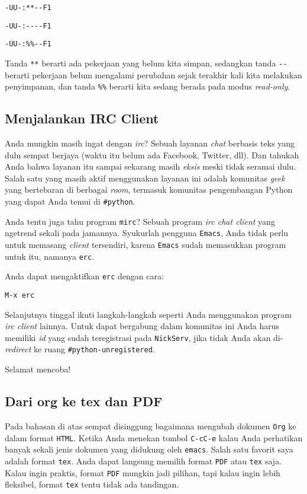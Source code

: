 \documentclass{article}
\begin{document}
\verb=-UU-:**--F1=

\verb=-UU-:----F1=

\verb=-UU-:%%--F1=

Tanda \verb=**= berarti ada pekerjaan yang belum kita simpan, sedangkan tanda
\verb=--= berarti pekerjaan belum mengalami perubahan sejak terakhir kali
kita melakukan penyimpanan, dan tanda \verb=%%= berarti kita sedang berada
pada modus \emph{read-only}.

\subsection{Menjalankan IRC Client}
Anda mungkin masih ingat dengan \emph{irc}? Sebuah layanan \emph{chat}
berbasis teks yang dulu sempat berjaya (waktu itu belum ada Facebook,
Twitter, dll). Dan tahukah Anda bahwa layanan itu sampai sekarang masih
\emph{eksis} meski tidak seramai dulu. Salah satu yang masih aktif
menggunakan layanan ini adalah komunitas \emph{geek} yang bertebaran
di berbagai \emph{room}, termasuk komunitas pengembangan Python yang
dapat Anda temui di \verb=#python=. 

Anda tentu juga tahu program \verb=mirc=? Sebuah program \emph{irc chat client}
yang ngetrend sekali pada jamannya. Syukurlah pengguna \verb=Emacs=, Anda 
tidak perlu untuk memasang \emph{client} tersendiri, karena \verb=Emacs= 
sudah memasukkan program untuk itu, namanya \verb=erc=.

Anda dapat mengaktifkan \verb=erc= dengan cara:

\begin{verbatim}
M-x erc
\end{verbatim}

Selanjutnya tinggal ikuti langkah-langkah seperti Anda menggunakan program
\emph{irc client} lainnya. Untuk dapat bergabung dalam komunitas
ini Anda harus memiliki \emph{id} yang sudah teregistrasi pada 
\verb=NickServ=, jika tidak Anda akan di-\emph{redirect} ke ruang
\verb=#python-unregistered=.

Selamat mencoba!

\subsection{Dari org ke tex dan PDF}
Pada bahasan di atas sempat disinggung bagaimana mengubah dokumen \verb=Org=
ke dalam format \verb=HTML=. Ketika Anda menekan tombol \verb=C-cC-e= 
kalau Anda perhatikan banyak sekali jenis dokumen yang didukung 
oleh \verb=emacs=. Salah satu favorit saya adalah format \verb=tex=. 
Anda dapat langsung memilih format \verb=PDF= atau \verb=tex= saja. 
Kalau ingin praktis, format \verb=PDF= mungkin jadi pilihan, tapi kalau 
ingin lebih fleksibel, format \verb=tex= tentu tidak ada tandingan.
\end{document}
